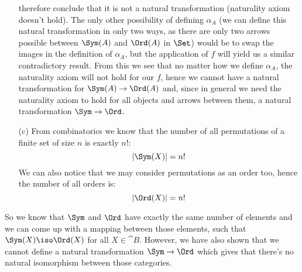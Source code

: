 \begin{answer}
\begin{itemize}
      therefore conclude that it is not a natural transformation (naturality
      axiom doesn't hold). The only other possibility of defining $\alpha_A$
      (we can define this natural transformation in only two ways, as there are
      only two arrows possible between $\Sym(A)$ and $\Ord(A)$ in $\Set$) would
      be to swap the images in the definition of $\alpha_A$, but the
      application of $f$ will yield us a similar contradictory result. From
      this we see that no matter how we define $\alpha_A$, the naturality axiom
      will not hold for our $f$, hence we cannot have a natural transformation
      for $\Sym(A) \to \Ord(A)$ and, since in general we need the naturality
      axiom to hold for all objects and arrows between them, a natural
      transformation $\Sym \to \Ord$.
    \item[(c)]
      From combinatorics we know that the number of all permutations of a
      finite set of size $n$ is exactly $n$!:\\
      \begin{equation*}
        |\Sym(X)| = n!
      \end{equation*}
      We can also notice that we may consider permutations as an order too,
      hence the number of all orders is:
      \begin{equation*}
        |\Ord(X)| = n!
      \end{equation*}
  \end{itemize}
  So we know that $\Sym$ and $\Ord$ have exactly the same number of elements
  and we can come up with a mapping between those elements, such that $\Sym(X)
  \iso \Ord(X)$ for all $X \in \cat{B}$. However, we have also shown that we
  cannot define a natural transformation $\Sym \to \Ord$ which gives that
  there's no natural isomorphism between those categories.
\end{answer}


